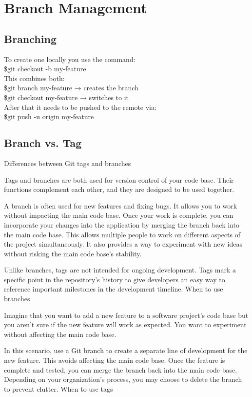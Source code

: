 \chapter{Branch Management}
\chapteroverlay
\section{Branching}
To create one locally you use the command:\\
\$git checkout -b my-feature\\
This combines both:\\
\$git branch my-feature → creates the branch\\
\$git checkout my-feature → switches to it\\

After that it needs to be pushed to the remote via:\\
\$git push -u origin my-feature\\

\section{Branch vs. Tag}
Differences between Git tags and branches

Tags and branches are both used for version control of your code base. Their functions complement each other, and they are designed to be used together.

A branch is often used for new features and fixing bugs. It allows you to work without impacting the main code base. Once your work is complete, you can incorporate your changes into the application by merging the branch back into the main code base. This allows multiple people to work on different aspects of the project simultaneously. It also provides a way to experiment with new ideas without risking the main code base's stability.

Unlike branches, tags are not intended for ongoing development. Tags mark a specific point in the repository’s history to give developers an easy way to reference important milestones in the development timeline.
When to use branches

Imagine that you want to add a new feature to a software project’s code base but you aren’t sure if the new feature will work as expected. You want to experiment without affecting the main code base.

In this scenario, use a Git branch to create a separate line of development for the new feature. This avoids affecting the main code base. Once the feature is complete and tested, you can merge the branch back into the main code base. Depending on your organization’s process, you may choose to delete the branch to prevent clutter.
When to use tags

